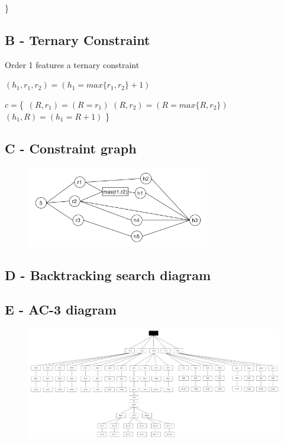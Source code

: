 \documentclass{article}
\begin{document}
\}\

\subsection{B - Ternary Constraint}
Order 1 features a ternary constraint 

$(h_1, r_1, r_2) = (h_1 = max\{r_1, r_2\} + 1)$ \newline

$c = $\{\
$(R, r_1) = (R = r_1)$ \newline
$(R, r_2) = (R = max\{R, r_2\})$ \newline
$(h_1, R) = (h_1 = R+1)$ \newline
\}\

\subsection{C - Constraint graph}

\begin{figure}[ht]
\includegraphics[width=8cm]{ConstraintGraph.png}
\centering
\end{figure}

\subsection{D - Backtracking search diagram}

 
\begin{landscape}

\begin{figure} {\centering  }\end{figure}

\end{landscape}

\subsection{E - AC-3 diagram}

\begin{figure}[ht]
\includegraphics[width=18cm]{AC-3 Graph.png}
\centering
\end{figure}
\end{document}

